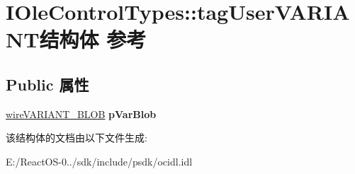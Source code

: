 \hypertarget{struct_i_ole_control_types_1_1tag_user_v_a_r_i_a_n_t}{}\section{I\+Ole\+Control\+Types\+:\+:tag\+User\+V\+A\+R\+I\+A\+N\+T结构体 参考}
\label{struct_i_ole_control_types_1_1tag_user_v_a_r_i_a_n_t}
\subsection*{Public 属性}
\begin{DoxyCompactItemize}
\item 
\mbox{\label{struct_i_ole_control_types_1_1tag_user_v_a_r_i_a_n_t_a0ed384205e19adc25227cfe4ceecbe48}} 
\hyperlink{struct_i_ole_control_types_1_1tag_v_a_r_i_a_n_t___b_l_o_b}{wire\+V\+A\+R\+I\+A\+N\+T\+\_\+\+B\+L\+OB} {\bfseries p\+Var\+Blob}
\end{DoxyCompactItemize}


该结构体的文档由以下文件生成\+:\begin{DoxyCompactItemize}
\item 
E\+:/\+React\+O\+S-\/0../sdk/include/psdk/ocidl.\+idl\end{DoxyCompactItemize}
